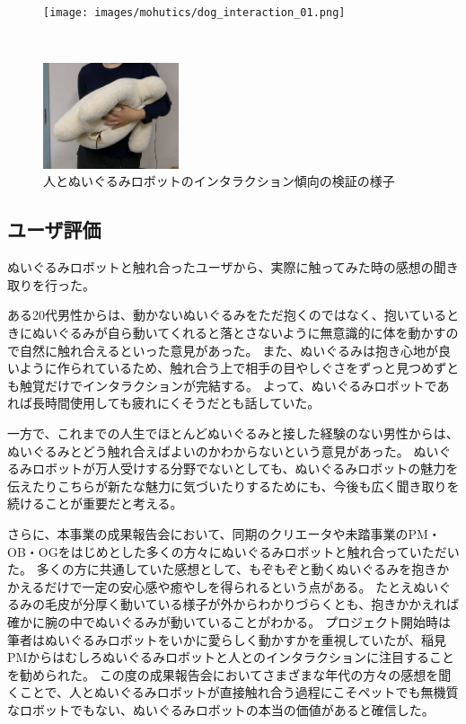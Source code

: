 \documentclass[uplatex,a4paper,12pt]{jsarticle}
\begin{document}
\begin{figure}[htbp]
  \centering
  \begin{minipage}[c]{0.96\linewidth}
    \centering
    \texttt{[image: images/mohutics/dog\_interaction\_01.png]}
  \end{minipage} \\
  \begin{minipage}[c]{0.96\linewidth}
    \centering
    \includegraphics[keepaspectratio,width=4cm,clip]{images/mohutics/funio_interaction_01.png}
  \end{minipage}
  \caption{人とぬいぐるみロボットのインタラクション傾向の検証の様子}
  \label{fig:mohutics:interaction}
\end{figure}



\subsection{ユーザ評価}
ぬいぐるみロボットと触れ合ったユーザから、実際に触ってみた時の感想の聞き取りを行った。

ある20代男性からは、動かないぬいぐるみをただ抱くのではなく、抱いているときにぬいぐるみが自ら動いてくれると落とさないように無意識的に体を動かすので自然に触れ合えるといった意見があった。
また、ぬいぐるみは抱き心地が良いように作られているため、触れ合う上で相手の目やしぐさをずっと見つめずとも触覚だけでインタラクションが完結する。
よって、ぬいぐるみロボットであれば長時間使用しても疲れにくそうだとも話していた。

一方で、これまでの人生でほとんどぬいぐるみと接した経験のない男性からは、ぬいぐるみとどう触れ合えばよいのかわからないという意見があった。
ぬいぐるみロボットが万人受けする分野でないとしても、ぬいぐるみロボットの魅力を伝えたりこちらが新たな魅力に気づいたりするためにも、今後も広く聞き取りを続けることが重要だと考える。

さらに、本事業の成果報告会において、同期のクリエータや未踏事業のPM・OB・OGをはじめとした多くの方々にぬいぐるみロボットと触れ合っていただいた。
多くの方に共通していた感想として、もぞもぞと動くぬいぐるみを抱きかかえるだけで一定の安心感や癒やしを得られるという点がある。
たとえぬいぐるみの毛皮が分厚く動いている様子が外からわかりづらくとも、抱きかかえれば確かに腕の中でぬいぐるみが動いていることがわかる。
プロジェクト開始時は筆者はぬいぐるみロボットをいかに愛らしく動かすかを重視していたが、稲見PMからはむしろぬいぐるみロボットと人とのインタラクションに注目することを勧められた。
この度の成果報告会においてさまざまな年代の方々の感想を聞くことで、人とぬいぐるみロボットが直接触れ合う過程にこそペットでも無機質なロボットでもない、ぬいぐるみロボットの本当の価値があると確信した。
\end{document}

